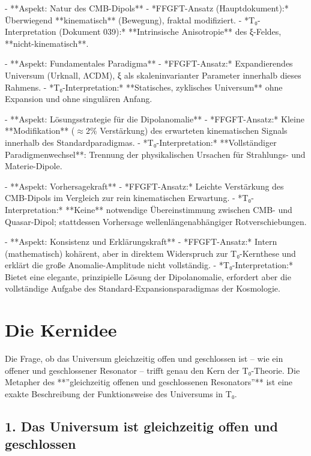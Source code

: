 - **Aspekt: Natur des CMB-Dipols**
- *FFGFT-Ansatz (Hauptdokument):* Überwiegend **kinematisch** (Bewegung), fraktal modifiziert.
- *T₀-Interpretation (Dokument 039):* **Intrinsische Anisotropie** des ξ-Feldes, **nicht-kinematisch**.

- **Aspekt: Fundamentales Paradigma**
- *FFGFT-Ansatz:* Expandierendes Universum (Urknall, ΛCDM), ξ als skaleninvarianter Parameter innerhalb dieses Rahmens.
- *T₀-Interpretation:* **Statisches, zyklisches Universum** ohne Expansion und ohne singulären Anfang.

- **Aspekt: Lösungsstrategie für die Dipolanomalie**
- *FFGFT-Ansatz:* Kleine **Modifikation** ($\approx$2\% Verstärkung) des erwarteten kinematischen Signals innerhalb des Standardparadigmas.
- *T₀-Interpretation:* **Vollständiger Paradigmenwechsel**: Trennung der physikalischen Ursachen für Strahlungs- und Materie-Dipole.

- **Aspekt: Vorhersagekraft**
- *FFGFT-Ansatz:* Leichte Verstärkung des CMB-Dipols im Vergleich zur rein kinematischen Erwartung.
- *T₀-Interpretation:* **Keine** notwendige Übereinstimmung zwischen CMB- und Quasar-Dipol; stattdessen Vorhersage wellenlängenabhängiger Rotverschiebungen.

- **Aspekt: Konsistenz und Erklärungskraft**
- *FFGFT-Ansatz:* Intern (mathematisch) kohärent, aber in direktem Widerspruch zur T₀-Kernthese und erklärt die große Anomalie-Amplitude nicht vollständig.
- *T₀-Interpretation:* Bietet eine elegante, prinzipielle Lösung der Dipolanomalie, erfordert aber die vollständige Aufgabe des Standard-Expansionsparadigmas der Kosmologie.

\section*{Die Kernidee}

Die Frage, ob das Universum gleichzeitig offen und geschlossen ist – wie ein offener und geschlossener Resonator – trifft genau den Kern der T₀-Theorie. Die Metapher des **''gleichzeitig offenen und geschlossenen Resonators''** ist eine exakte Beschreibung der Funktionsweise des Universums in T₀.

\subsection*{1. Das Universum ist gleichzeitig offen und geschlossen}

